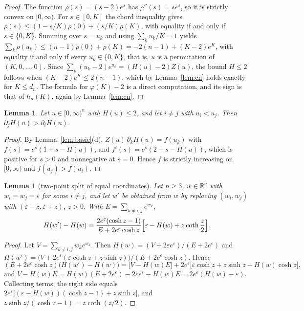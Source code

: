 \documentclass[11pt,a4paper]{article}
\theoremstyle{plain}
\newtheorem{lemma}[theorem]{Lemma}
\theoremstyle{definition}
\newcommand{\R}{\mathbb{R}}
\begin{document}
\begin{proof}
The function $\rho(s)=(s-2)e^{s}$ has $\rho''(s)=se^{s}$, so it is strictly convex on $[0,\infty)$. For $s\in[0,K]$ the chord inequality gives $\rho(s)\le(1-s/K)\rho(0)+(s/K)\rho(K)$, with equality if and only if $s\in\{0,K\}$. Summing over $s=u_k$ and using $\sum_k u_k/K=1$ yields $\sum_k\rho(u_k)\le(n-1)\rho(0)+\rho(K)=-2(n-1)+(K-2)e^{K}$, with equality if and only if every $u_k\in\{0,K\}$, that is, $u$ is a permutation of $(K,0,\dots,0)$. Since $\sum_k(u_k-2)e^{u_k}=(H(u)-2)Z(u)$, the bound $H\le 2$ follows when $(K-2)e^{K}\le 2(n-1)$, which by Lemma~\ref{lem:cn} holds exactly for $K\le d_n$. The formula for $\varphi(K)-2$ is a direct computation, and its sign is that of $h_n(K)$, again by Lemma~\ref{lem:cn}.
\end{proof}

\begin{lemma}\label{lem:Hderiv}
Let $u\in[0,\infty)^n$ with $H(u)\le 2$, and let $i\ne j$ with $u_i<u_j$. Then $\partial_jH(u)>\partial_iH(u)$.
\end{lemma}

\begin{proof}
By Lemma~\ref{lem:basic}(d), $Z(u)\,\partial_kH(u)=f(u_k)$ with $f(s)=e^{s}(1+s-H(u))$, and $f'(s)=e^{s}(2+s-H(u))$, which is positive for $s>0$ and nonnegative at $s=0$. Hence $f$ is strictly increasing on $[0,\infty)$ and $f(u_j)>f(u_i)$.
\end{proof}

\begin{lemma}[two-point split of equal coordinates]\label{lem:Hsplit}
Let $n\ge 3$, $w\in\R^n$ with $w_i=w_j=\varepsilon$ for some $i\ne j$, and let $w'$ be obtained from $w$ by replacing $(w_i,w_j)$ with $(\varepsilon-z,\varepsilon+z)$, $z>0$. With $E=\sum_{k\ne i,j}e^{w_k}$,
\begin{equation}\label{eq:Hsplit}
H(w')-H(w)=\frac{2e^{\varepsilon}(\cosh z-1)}{E+2e^{\varepsilon}\cosh z}\Bigl[\varepsilon-H(w)+z\coth\frac z2\Bigr].
\end{equation}
\end{lemma}

\begin{proof}
Let $V=\sum_{k\ne i,j}w_ke^{w_k}$. Then $H(w)=(V+2\varepsilon e^{\varepsilon})/(E+2e^{\varepsilon})$ and $H(w')=\bigl(V+2e^{\varepsilon}(\varepsilon\cosh z+z\sinh z)\bigr)/(E+2e^{\varepsilon}\cosh z)$. Hence
\[
(E+2e^{\varepsilon}\cosh z)\bigl(H(w')-H(w)\bigr)=\bigl[V-H(w)E\bigr]+2e^{\varepsilon}\bigl[\varepsilon\cosh z+z\sinh z-H(w)\cosh z\bigr],
\]
and $V-H(w)E=H(w)(E+2e^{\varepsilon})-2\varepsilon e^{\varepsilon}-H(w)E=2e^{\varepsilon}(H(w)-\varepsilon)$. Collecting terms, the right side equals $2e^{\varepsilon}\bigl[(\varepsilon-H(w))(\cosh z-1)+z\sinh z\bigr]$, and $z\sinh z/(\cosh z-1)=z\coth(z/2)$.
\end{proof}
\end{document}

